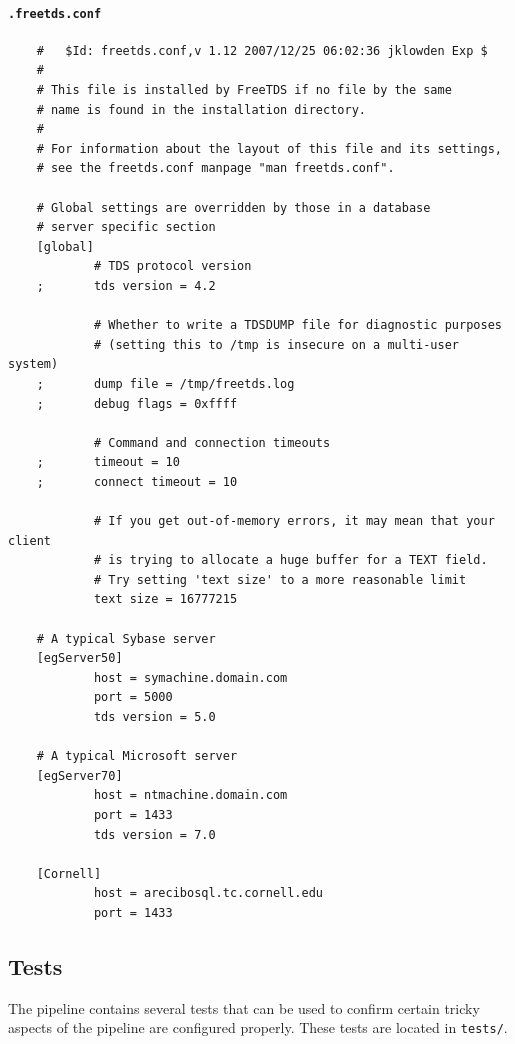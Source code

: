 \documentclass[12pt]{article}
\begin{document}
\paragraph{\texttt{.freetds.conf}}
\begin{verbatim}
    #   $Id: freetds.conf,v 1.12 2007/12/25 06:02:36 jklowden Exp $
    #
    # This file is installed by FreeTDS if no file by the same 
    # name is found in the installation directory.  
    #
    # For information about the layout of this file and its settings, 
    # see the freetds.conf manpage "man freetds.conf".  

    # Global settings are overridden by those in a database
    # server specific section
    [global]
            # TDS protocol version
    ;       tds version = 4.2

            # Whether to write a TDSDUMP file for diagnostic purposes
            # (setting this to /tmp is insecure on a multi-user system)
    ;       dump file = /tmp/freetds.log
    ;       debug flags = 0xffff

            # Command and connection timeouts
    ;       timeout = 10
    ;       connect timeout = 10
            
            # If you get out-of-memory errors, it may mean that your client
            # is trying to allocate a huge buffer for a TEXT field.  
            # Try setting 'text size' to a more reasonable limit 
            text size = 16777215

    # A typical Sybase server
    [egServer50]
            host = symachine.domain.com
            port = 5000
            tds version = 5.0

    # A typical Microsoft server
    [egServer70]
            host = ntmachine.domain.com
            port = 1433
            tds version = 7.0

    [Cornell]
            host = arecibosql.tc.cornell.edu
            port = 1433
\end{verbatim}

\subsection{Tests}
\label{sec:tests}
The pipeline contains several tests that can be used to confirm certain tricky aspects of the pipeline are configured properly. These tests are located in \texttt{tests/}.
\end{document}
